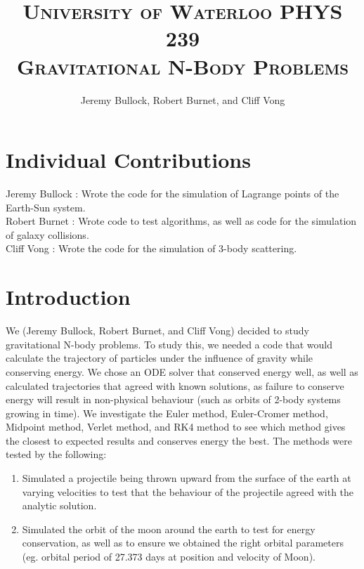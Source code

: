 \documentclass[10pt,letterpaper]{article}
\begin{document}
\title{\scshape\LARGE University of Waterloo \vfill \bfseries PHYS 239 \\ \huge\bfseries Gravitational N-Body Problems\vfill }
\author{Jeremy Bullock, Robert Burnet, and Cliff Vong}
\maketitle

\newpage

\tableofcontents

\vfill

\section*{Individual Contributions}

Jeremy Bullock : Wrote the code for the simulation of Lagrange points of the Earth-Sun system.\\
Robert Burnet : Wrote code to test algorithms, as well as code for the simulation of galaxy collisions.\\
Cliff Vong : Wrote the code for the simulation of 3-body scattering.\\

\newpage


\section{Introduction}

We (Jeremy Bullock, Robert Burnet, and Cliff Vong) decided to study gravitational N-body problems. To study this, we needed a code that would calculate the trajectory of particles under the influence of gravity while conserving energy. We chose an ODE solver that conserved energy well, as well as calculated trajectories that agreed with known solutions, as failure to conserve energy will result in non-physical behaviour (such as orbits of 2-body systems growing in time). We investigate the Euler method, Euler-Cromer method, Midpoint method, Verlet method, and RK4 method to see which method gives the closest to expected results and conserves energy the best. The methods were tested by the following:\\

\begin{enumerate}
\item Simulated a projectile being thrown upward from the surface of the earth at varying velocities to test that the behaviour of the projectile agreed with the analytic solution.
\item Simulated the orbit of the moon around the earth to test for energy conservation, as well as to ensure we obtained the right orbital parameters (eg. orbital period of 27.373 days at position and velocity of Moon).
\end{enumerate}
\end{document}
